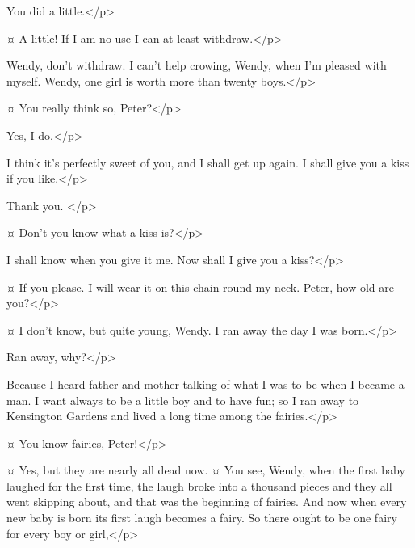 \peterspeaks
You did a little.</p>

\wendyspeaks {}¤
A little!
If I am no use I can at least withdraw.</p>


\peterspeaks
Wendy, don't withdraw.
I can't help crowing, Wendy, when I'm pleased with myself.
Wendy, one girl is worth more than twenty boys.</p>

\wendyspeaks {}¤
You really think so, Peter?</p>

\peterspeaks
Yes, I do.</p>

\wendyspeaks
I think it's perfectly sweet of you, and I shall get up again.
I shall give you a kiss if you like.</p>

\peterspeaks
Thank you.
</p>

\wendyspeaks {}¤
Don't you know what a kiss is?</p>

\peterspeaks
I shall know when you give it me.
Now shall I give you a kiss?</p>

\wendyspeaks {}¤
If you please.
I will wear it on this chain round my neck.
Peter, how old are you?</p>

\peterspeaks {}¤
I don't know, but quite young, Wendy.
I ran away the day I was born.</p>

\wendyspeaks
Ran away, why?</p>

\peterspeaks
Because I heard father and mother talking of what I was to be when I became a man.
I want always to be a little boy and to have fun; so I ran away to Kensington Gardens and lived a long time among the fairies.</p>

\wendyspeaks {}¤
You know fairies, Peter!</p>

\peterspeaks {}¤
Yes, but they are nearly all dead now.
¤
You see, Wendy, when the first baby laughed for the first time, the laugh broke into a thousand pieces and they all went skipping about, and that was the beginning of fairies.
And now when every new baby is born its first laugh becomes a fairy.
So there ought to be one fairy for every boy or girl,</p>

